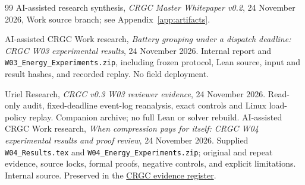 \documentclass[11pt,letterpaper]{article}
\begin{document}
\begin{thebibliography}{99}
 AI-assisted research synthesis, \emph{CRGC Master Whitepaper v0.2}, 24 November 2026, Work source branch; see Appendix~\ref{app:artifacts}.

 AI-assisted CRGC Work research, \emph{Battery grouping under a dispatch deadline: CRGC W03 experimental results}, 24 November 2026. Internal report and \texttt{W03\_Energy\_Experiments.zip}, including frozen protocol, Lean source, input and result hashes, and recorded replay. No field deployment.

 Uriel Research, \emph{CRGC v0.3 W03 reviewer evidence}, 24 November 2026. Read-only audit, fixed-deadline event-log reanalysis, exact controls and Linux load-policy replay. Companion archive; no full Lean or solver rebuild.
 AI-assisted CRGC Work research, \emph{When compression pays for itself: CRGC W04 experimental results and proof review}, 24 November 2026. Supplied \texttt{W04\_Results.tex} and \texttt{W04\_Energy\_Experiments.zip}; original and repeat evidence, source locks, formal proofs, negative controls, and explicit limitations. Internal source. Preserved in the \href{https://chatgpt.com/space/page_401978a551908191b29294e4c7019840}{CRGC evidence register}.
\end{thebibliography}
\end{document}
